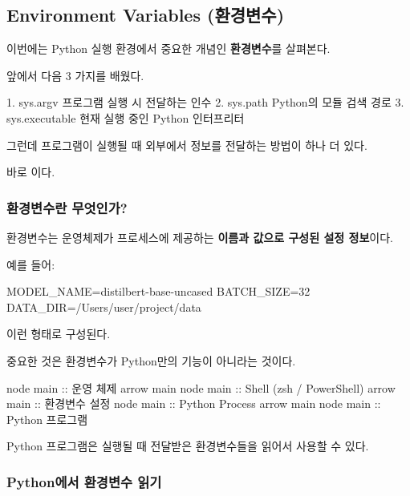 

\subsection{Environment Variables (환경변수)}

이번에는 Python 실행 환경에서 중요한 개념인 \textbf{환경변수}를 살펴본다.

앞에서 다음 3 가지를 배웠다.

\begin{dhksmry}
    1. sys.argv       \ra 프로그램 실행 시 전달하는 인수
    2. sys.path       \ra Python의 모듈 검색 경로
    3. sys.executable \ra 현재 실행 중인 Python 인터프리터
\end{dhksmry}

그런데 프로그램이 실행될 때 외부에서 정보를 전달하는 방법이 하나 더 있다.

바로 이다.

\subsubsection{환경변수란 무엇인가?}

환경변수는 운영체제가 프로세스에 제공하는 \textbf{이름과 값으로 구성된 설정 정보}이다.

예를 들어:

\begin{dhkcode}
MODEL_NAME=distilbert-base-uncased
BATCH_SIZE=32
DATA_DIR=/Users/user/project/data
\end{dhkcode}

이런 형태로 구성된다.

중요한 것은 환경변수가 Python만의 기능이 아니라는 것이다.

\begin{dhkbranch}[in=10]
node main :: 운영 체제
arrow main
node main :: Shell (zsh / PowerShell)
arrow main :: 환경변수 설정
node main :: Python Process
arrow main
node main :: Python 프로그램
\end{dhkbranch}

Python 프로그램은 실행될 때 전달받은 환경변수들을 읽어서 사용할 수 있다.

\subsubsection{Python에서 환경변수 읽기}

